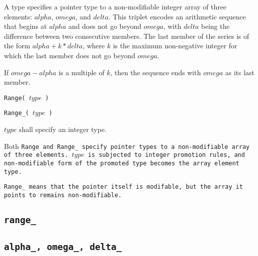A  type specifies a pointer type to a non-modifiable
integer array of three elements: $alpha$, $omega$, and $delta$.
This triplet encodes an arithmetic sequence that begins at $alpha$ and does not go
beyond $omega$, with $delta$ being the difference between two consecutive members.
The last member of the series is of the form $alpha + k*delta$, where $k$ is the
maximum non-negative integer for which the last member does not go beyond $omega$.

\note If $omega - alpha$ is a multiple of $k$,
then the sequence ends with $omega$ as its last member.


\tt{Range}\s\s\tt{(} $type$ \tt{)}

\tt{Range_}\s\tt{(}  $type$ \tt{)}


$type$ shall specify an integer type.


Both \tt{Range} and \tt{Range_} specify pointer types to a non-modifiable
array of three elements. $type$ is subjected to integer promotion rules,
and non-modifiable form of the promoted type becomes the array element type.

\note \tt{Range_} means that the pointer itself is modifable,
but the array it points to remains non-modifiable.

\subsection{\tt{range_}}


\subsection{\tt{alpha_}, \tt{omega_}, \tt{delta_}}

